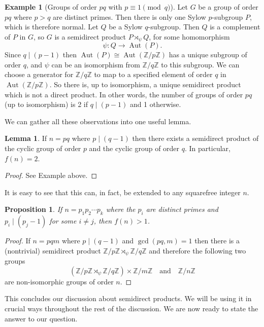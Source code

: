 \documentclass[12pt,reqno]{amsart}
\theoremstyle{plain}
\newtheorem{prop}[thm]{Proposition}
\theoremstyle{definition}
\newtheorem{eg}{Example}
\numberwithin{equation}{section}
\newtheorem{lemma}{Lemma}
\begin{document}
\begin{eg}[Groups of order $pq$ with $p\equiv1 \pmod q$]\phantom{.}\newline
Let $G$ be a group of order $pq$ where $p>q$ are distinct primes. Then there is only one Sylow $p$-subgroup $P$, which is therefore normal. Let $Q$ be a Sylow $q$-subgroup. Then $Q$ is a complement of $P$ in $G$, so $G$ is a semidirect product $P\rtimes_{\psi}Q$, for some homomorphism \[\psi:Q\rightarrow \operatorname{Aut}(P).\] Since $q \mid (p-1)$ then $\operatorname{Aut}(P)\cong \operatorname{Aut}(\mathbb{Z}/p\mathbb{Z})$ has a unique subgroup of order $q$, and $\psi$ can be an isomorphism from $\mathbb{Z}/q\mathbb{Z}$ to this subgroup. We can choose a generator for $\mathbb{Z}/q\mathbb{Z}$ to map to a specified element of order $q$ in $\operatorname{Aut}(\mathbb{Z}/p\mathbb{Z})$. So there is, up to isomorphism, a unique semidirect product which is not a direct product. In other words, the number of groups of order $pq$ (up to isomorphism) is 2 if $q \mid (p-1)$ and 1 otherwise.
\end{eg}

We can gather all these observations into one useful lemma.

\begin{lemma}
If $n=pq$ where $p \mid (q-1)$ then there exists a semidirect product of the cyclic group of order $p$ and the cyclic group of order $q$. In particular, $f(n)=2$.
\end{lemma}
\begin{proof}
See Example above.
\end{proof}

It is easy to see that this can, in fact, be extended to any squarefree integer $n$.

\begin{prop}
If $n=p_1 p_2 \cdots p_k$ where the $p_i$ are distinct primes and $p_i \mid (p_j-1)$ for some $i\ne j$, then $f(n)>1$.
\end{prop}
\begin{proof}
If $n=pqm$ where $p \mid (q-1)$ and $\operatorname{gcd}(pq,m)=1$ then there is a (nontrivial) semidirect product $\mathbb{Z}/p\mathbb{Z}\rtimes_{\psi}\mathbb{Z}/q\mathbb{Z}$ and therefore the following two groups \[(\mathbb{Z}/p\mathbb{Z}\rtimes_{\psi}\mathbb{Z}/q\mathbb{Z})\times\mathbb{Z}/m\mathbb{Z} \quad \text{and} \quad \mathbb{Z}/n\mathbb{Z}\] are non-isomorphic groups of order $n$.
\end{proof}

This concludes our discussion about semidirect products. We will be using it in crucial ways throughout the rest of the discussion. We are now ready to state the answer to our question.
\end{document}

